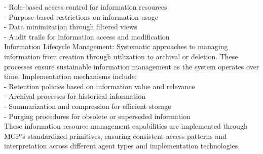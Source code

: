 - Role-based access control for information resources\\ \newline
- Purpose-based restrictions on information usage\\ \newline
- Data minimization through filtered views\\ \newline
- Audit trails for information access and modification\\ \newline
Information Lifecycle Management: Systematic approaches to managing information from creation through utilization to archival or deletion. These processes ensure sustainable information management as the system operates over time. Implementation mechanisms include:\\ \newline
- Retention policies based on information value and relevance\\ \newline
- Archival processes for historical information\\ \newline
- Summarization and compression for efficient storage\\ \newline
- Purging procedures for obsolete or superseded information\\ \newline
These information resource management capabilities are implemented through MCP's standardized primitives, ensuring consistent access patterns and interpretation across different agent types and implementation technologies.\\
